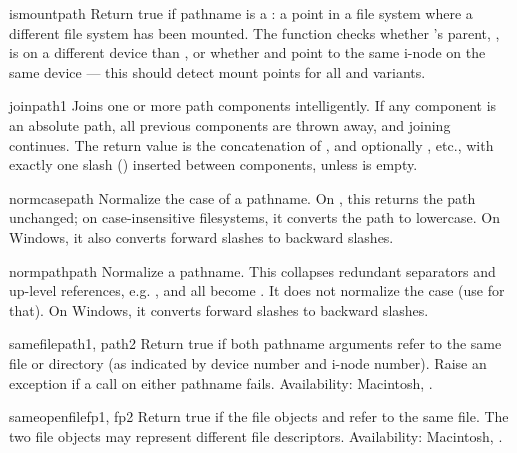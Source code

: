 \begin{funcdesc}{ismount}{path}
Return true if pathname  is a : a point in
a file system where a different file system has been mounted.  The
function checks whether 's parent, , is
on a different device than , or whether 
and  point to the same i-node on the same device --- this
should detect mount points for all \UNIX{} and \POSIX{} variants.
\end{funcdesc}

\begin{funcdesc}{join}{path1}
Joins one or more path components intelligently.  If any component is
an absolute path, all previous components are thrown away, and joining
continues.  The return value is the concatenation of , and
optionally , etc., with exactly one slash ()
inserted between components, unless  is empty.
\end{funcdesc}

\begin{funcdesc}{normcase}{path}
Normalize the case of a pathname.  On \UNIX{}, this returns the path
unchanged; on case-insensitive filesystems, it converts the path to
lowercase.  On Windows, it also converts forward slashes to backward
slashes.
\end{funcdesc}

\begin{funcdesc}{normpath}{path}
Normalize a pathname.  This collapses redundant separators and
up-level references, e.g. ,  and
 all become .  It does not normalize the
case (use  for that).  On Windows, it converts
forward slashes to backward slashes.
\end{funcdesc}

\begin{funcdesc}{samefile}{path1, path2}
Return true if both pathname arguments refer to the same file or
directory (as indicated by device number and i-node number).
Raise an exception if a  call on either pathname
fails.
Availability:  Macintosh, \UNIX{}.
\end{funcdesc}

\begin{funcdesc}{sameopenfile}{fp1, fp2}
Return true if the file objects  and  refer to the
same file.  The two file objects may represent different file
descriptors.
Availability:  Macintosh, \UNIX{}.
\end{funcdesc}

